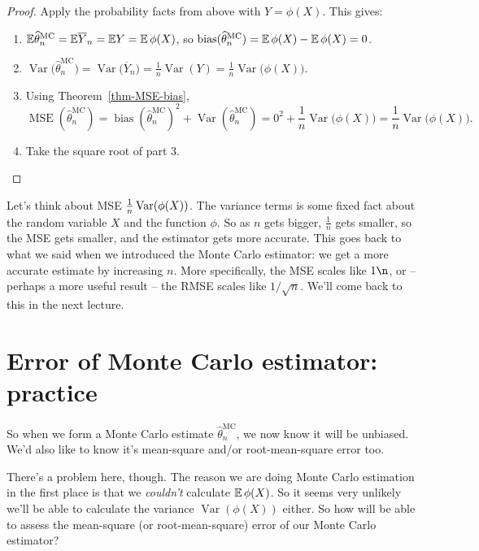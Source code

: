 \documentclass[
  letterpaper,
  DIV=11,
  numbers=noendperiod]{scrreprt}
\theoremstyle{plain}
\theoremstyle{definition}
\theoremstyle{definition}
\theoremstyle{remark}
\begin{document}
\begin{proof}
Apply the probability facts from above with \(Y = \phi(X)\). This gives:

\begin{enumerate}
\def\labelenumi{\arabic{enumi}.}
\item
  \(\mathbb{E} \widehat{\theta}_n^{\mathrm{MC}} = \mathbb{E} \overline Y_n = \mathbb{E} Y = \operatorname{\mathbb{E}} \phi(X)\),
  so
  \(\operatorname{bias}(\widehat{\theta}_n^{\mathrm{MC}}) = \operatorname{\mathbb{E}} \phi(X) - \operatorname{\mathbb{E}} \phi(X) = 0\).
\item
  \({\displaystyle \operatorname{Var}\big(\widehat{\theta}_n^{\mathrm{MC}}\big) = \operatorname{Var}\big(\overline Y_n\big) = \frac{1}{n} \operatorname{Var}(Y) = \frac{1}{n} \operatorname{Var}\big(\phi(X)\big)}\).
\item
  Using Theorem~\ref{thm-MSE-bias},
  \[\operatorname{MSE}(\widehat{\theta}_n^{\mathrm{MC}}) = \operatorname{bias}(\widehat{\theta}_n^{\mathrm{MC}})^2 + \operatorname{Var}(\widehat{\theta}_n^{\mathrm{MC}}) = 0^2 + \frac{1}{n} \operatorname{Var}\big(\phi(X)\big) = \frac{1}{n} \operatorname{Var}\big(\phi(X)\big) . \]
\item
  Take the square root of part 3.
\end{enumerate}

\end{proof}

Let's think about MSE \(\frac{1}{n} \operatorname{Var}(\phi(X))\). The variance terms
is some fixed fact about the random variable \(X\) and the function
\(\phi\). So as \(n\) gets bigger, \(\frac{1}{n}\) gets smaller, so the
MSE gets smaller, and the estimator gets more accurate. This goes back
to what we said when we introduced the Monte Carlo estimator: we get a
more accurate estimate by increasing \(n\). More specifically, the MSE
scales like \(1\n\), or -- perhaps a more useful result -- the RMSE
scales like \(1/\sqrt{n}\). We'll come back to this in the next lecture.

\section{Error of Monte Carlo estimator:
practice}\label{error-of-monte-carlo-estimator-practice}

So when we form a Monte Carlo estimate \(\hat\theta_n^{\text{MC}}\), we
now know it will be unbiased. We'd also like to know it's mean-square
and/or root-mean-square error too.

There's a problem here, though. The reason we are doing Monte Carlo
estimation in the first place is that we \emph{couldn't} calculate
\(\operatorname{\mathbb{E}} \phi(X)\). So it seems very unlikely we'll be able to calculate
the variance \(\operatorname{Var}(\phi(X))\) either. So how will be able
to assess the mean-square (or root-mean-square) error of our Monte Carlo
estimator?
\end{document}
